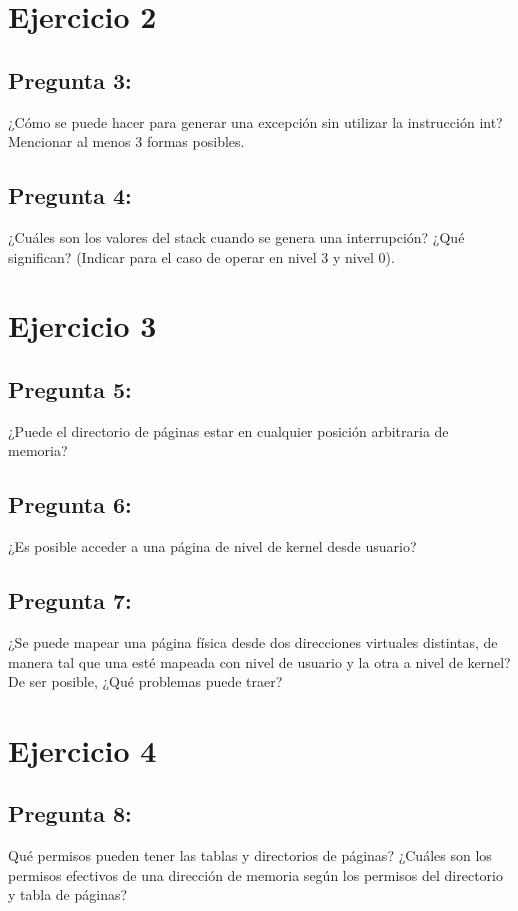 \documentclass[10pt, a4paper]{article}
\begin{document}
\section{Ejercicio 2}
{\subsection{Pregunta 3:}} ¿Cómo se puede hacer para generar una excepción sin utilizar la instrucción int? Mencionar al menos 3 formas posibles.\newline

{\subsection{Pregunta 4:}} ¿Cuáles son los valores del stack cuando se genera una interrupción? ¿Qué significan? (Indicar para el caso de operar en nivel 3 y nivel 0).\newline


\section{Ejercicio 3}
{\subsection{Pregunta 5:}} ¿Puede el directorio de páginas estar en cualquier posición arbitraria de memoria?\newline

{\subsection{Pregunta 6:}} ¿Es posible acceder a una página de nivel de kernel desde usuario?\newline

{\subsection{Pregunta 7:}} ¿Se puede mapear una página física desde dos direcciones virtuales
distintas, de manera tal que una esté mapeada con nivel de usuario y la otra a nivel de kernel? De ser posible, ¿Qué problemas puede traer?\newline

\section{Ejercicio 4}
{\subsection{Pregunta 8:}} Qué permisos pueden tener las tablas y directorios de páginas? ¿Cuáles son los permisos efectivos de una dirección de memoria según los permisos del directorio
y tabla de páginas?
\end{document}
